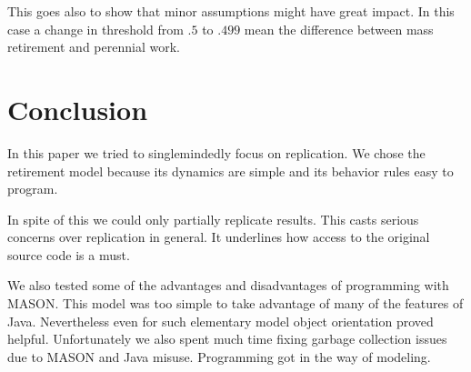 \documentclass[runningheads,a4paper]{llncs}
\begin{document}
This goes also to show that minor assumptions might have great impact.
In this case a change in threshold from $.5$ to $.499$ mean the difference between mass retirement and perennial work.

\section{Conclusion}

In this paper we tried to singlemindedly focus on replication.
We chose the retirement model because its dynamics are simple and its behavior rules easy to program.

In spite of this we could only partially replicate results.
This casts serious concerns over replication in general.
It underlines how access to the original source code is a must.

We also tested some of the advantages and disadvantages of programming with MASON.
This model was too simple to take advantage of many of the features of Java.
Nevertheless even for such elementary model object orientation proved helpful.
Unfortunately we also spent much time fixing garbage collection issues due to MASON and Java misuse.
Programming got in the way of modeling.








\end{document}
